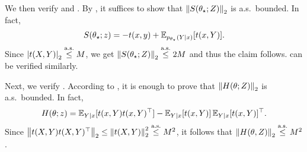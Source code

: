 \begin{example}
    We then verify  and .
    By , it suffices to show that $\left\lVert S(\theta_\star; Z) \right\rVert_2$ is a.s.~bounded.
    In fact,
    \begin{align*}
        S(\theta_\star; z) = -t(x, y) + \operatorname{\mathbb E}_{p_{\theta_\star}(Y \mid x)}[t(x, Y)].
    \end{align*}
    Since $\left| t(X, Y) \right|_2 \overset{\mbox{\scriptsize a.s.}}{\le} M$, we get $\left\lVert S(\theta_\star; Z) \right\rVert_2 \overset{\mbox{\scriptsize a.s.}}{\le} 2M$ and thus the claim follows.
     can be verified similarly.
    
    Next, we verify .
    According to , it is enough to prove that $\left\lVert H(\theta; Z) \right\rVert_2$ is a.s.~bounded.
    In fact,
    \begin{align*}
        H(\theta; z) = \operatorname{\mathbb E}_{Y \mid x}[t(x, Y) t(x, Y)^\top] - \operatorname{\mathbb E}_{Y \mid x}[t(x, Y)] \operatorname{\mathbb E}_{Y \mid x}[t(x, Y)]^\top.
    \end{align*}
    Since $\left\lVert t(X, Y) t(X, Y)^\top \right\rVert_2 \le \left\lVert t(X, Y) \right\rVert_2^2 \overset{\mbox{\scriptsize a.s.}}{\le} M^2$, it follows that $\left\lVert H(\theta, Z) \right\rVert_2 \overset{\mbox{\scriptsize a.s.}}{\le} M^2$.
    

\end{example}
